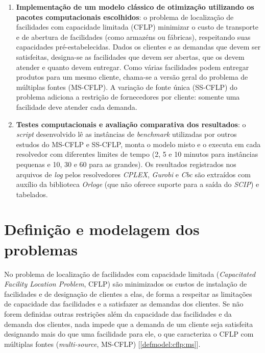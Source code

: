 \documentclass[]{article}
\newcommand{ \solver }[1]{\textit{#1}}
\newcommand{ \python }[1]{\textit{#1}}
\newif\ifartigo
\begin{document}
\begin{enumerate}
			\item \textbf{Implementação de um modelo clássico de otimização utilizando os pacotes computacionais escolhidos}:
				o problema de localização de facilidades com capacidade limitada (CFLP) minimizar o custo de transporte e de abertura de facilidades (como armazéns ou fábricas), respeitando suas capacidades pré-estabelecidas. 
				Dados os clientes e as demandas que devem ser satisfeitas, designa-se as facilidades que devem ser abertas, que os devem atender e quanto devem entregar.  
				Como várias facilidades podem entregar produtos para um mesmo cliente, chama-se a versão geral do problema de múltiplas fontes (MS-CFLP).
				A variação de fonte única (SS-CFLP) do problema adiciona a restrição de fornecedores por cliente: somente uma facilidade deve atender cada demanda.
			
			 
			
			\item \textbf{Testes computacionais e avaliação comparativa dos resultados}:
				o \textit{script} desenvolvido lê as instâncias de \textit{benchmark} utilizadas por outros estudos do MS-CFLP e SS-CFLP, monta o modelo misto e o executa em cada resolvedor com diferentes limites de tempo (2, 5 e 10 minutos para instâncias pequenas e 10, 30 e 60 para as grandes).    
				Os resultados registrados nos arquivos de \textit{log} pelos resolvedores \solver{CPLEX}, \solver{Gurobi} e \solver{Cbc} são extraídos com auxílio da biblioteca \python{Orloge} \cite{orloge} (que não oferece suporte para a saída do \solver{SCIP}) e tabelados.  
				
				
		\end{enumerate}
\fi	

\ifartigo
	\section{Revisão da literatura}
	
\fi		

\ifartigo	
	\section{Definição e modelagem dos problemas} \label{defmodel:cflp}
	
		No problema de localização de facilidades com capacidade limitada (\textit{Capacitated Facility Location Problem}, CFLP) são minimizados os custos de instalação de facilidades e de designação de clientes a elas, de forma a respeitar as limitações de capacidade das facilidades e a satisfazer as demandas dos clientes.      
		Se não forem definidas outras restrições além da capacidade das facilidades e da demanda dos clientes, nada impede que a demanda de um cliente seja satisfeita designando mais do que uma facilidade para ele, o que caracteriza o CFLP com múltiplas fontes (\textit{multi-source}, MS-CFLP) [\ref{defmodel:cflp:ms}].  
		
\end{document}
